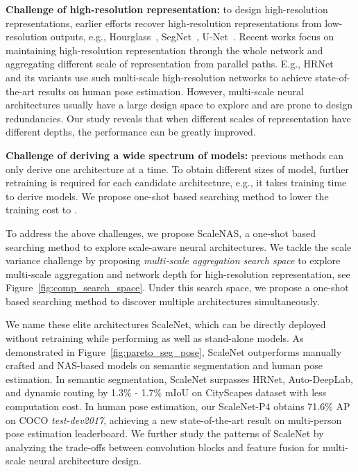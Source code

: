 \documentclass[final]{cvpr}
\newcommand{\workname}{ScaleNAS\xspace}
\newcommand{\netname}{ScaleNet\xspace}
\begin{document}
\textbf{Challenge of high-resolution representation:}
to design high-resolution representations, earlier efforts recover high-resolution representations from low-resolution outputs, e.g., Hourglass~\cite{newell2016stacked}, SegNet~\cite{badrinarayanan2017segnet}, U-Net~\cite{ronneberger2015u}. Recent works focus on maintaining high-resolution representation through the whole network and aggregating different scale of representation from parallel paths. E.g., HRNet~\cite{sun2019deep, wang2020deep} and its variants use such multi-scale high-resolution networks to achieve state-of-the-art results on human pose estimation. 
However, multi-scale neural architectures usually have a large design space to explore and are prone to design redundancies. 
Our study reveals that when different scales of representation have different depths, the performance can be greatly improved. 

\textbf{Challenge of deriving a wide spectrum of models:}
previous methods can only derive one architecture at a time. To obtain different sizes of model, further retraining is required for each candidate architecture,  
e.g., it takes  training time to derive  models.
We propose one-shot based searching method to lower the training cost to . 


To address the above challenges, we propose \workname, a one-shot based searching method to explore scale-aware neural architectures.
We tackle the scale variance challenge by proposing \textit{multi-scale aggregation search space} to explore multi-scale aggregation and network depth for high-resolution representation, see Figure~\ref{fig:comp_search_space}.
Under this search space, we propose a one-shot based searching method to discover multiple  architectures simultaneously. 

We name these elite architectures \netname, which can be directly deployed without retraining while performing as well as stand-alone models. As demonstrated in Figure~\ref{fig:pareto_seg_pose},
\netname outperforms manually crafted and NAS-based models on semantic segmentation and human pose estimation. In semantic segmentation, \netname surpasses HRNet, Auto-DeepLab, and dynamic routing by 1.3\% - 1.7\% mIoU on CityScapes dataset with less computation cost. In human pose estimation, our  ScaleNet-P4 obtains 71.6\% AP on COCO \textit{test-dev2017}, achieving a new state-of-the-art result on multi-person pose estimation leaderboard.
We further study the patterns of \netname by analyzing the trade-offs between convolution blocks and feature fusion for multi-scale neural architecture design.
\end{document}
